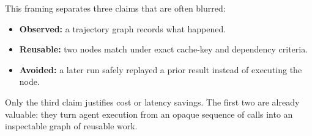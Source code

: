 This framing separates three claims that are often blurred:

\begin{itemize}[leftmargin=1.5em]
  \item \textbf{Observed:} a trajectory graph records what happened.
  \item \textbf{Reusable:} two nodes match under exact cache-key and dependency criteria.
  \item \textbf{Avoided:} a later run safely replayed a prior result instead of executing the node.
\end{itemize}

Only the third claim justifies cost or latency savings. The first two are already valuable: they turn agent execution from an opaque sequence of calls into an inspectable graph of reusable work.
